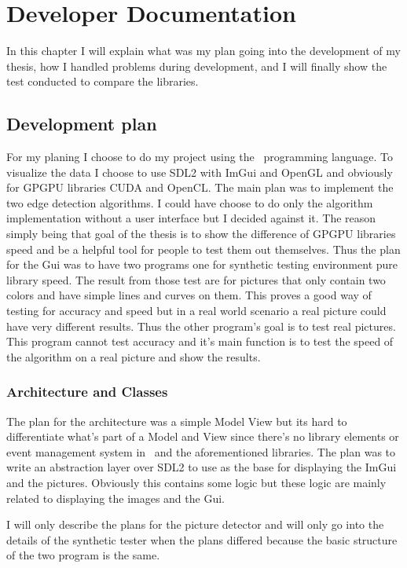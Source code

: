 \chapter{Developer Documentation}

In this chapter I will explain what was my plan going into the development of my thesis, how I handled problems during development, and I will finally show the test conducted to compare the libraries.

\section{Development plan}
\label{chap:plan}

For my planing I choose to do my project using the \CC\ programming language. To visualize the data I choose to use \ac{SDL2} with \ac{ImGui} and OpenGL and obviously for \ac{GPGPU} libraries CUDA and OpenCL. The main plan was to implement the two edge detection algorithms. I could have choose to do only the algorithm implementation without a user interface but I decided against it. The reason simply being that goal of the thesis is to show the difference of \ac{GPGPU} libraries speed and be a helpful tool for people to test them out themselves. Thus the plan for the Gui was to have two programs one for synthetic testing environment pure library speed. The result from those test are for pictures that only contain two colors and have simple lines and curves on them. This proves a good way of testing for accuracy and speed but in a real world scenario a real picture could have very different results. Thus the other program's goal is to test real pictures. This program cannot test accuracy and it's main function is to test the speed of the algorithm on a real picture and show the results.


\subsection{Architecture and Classes}
\label{chap:dev}
The plan for the architecture was a simple Model View but its hard to differentiate what's part of a Model and View since there's no library elements or event management system in \CC\ and the aforementioned libraries. The plan was to write an abstraction layer over \ac{SDL2} to use as the base for displaying the \ac{ImGui} and the pictures. Obviously this contains some logic but these logic are mainly related to displaying the images and the Gui.

I will only describe the plans for the picture detector and will only go into the details of the synthetic tester when the plans differed because the basic structure of the two program is the same.

